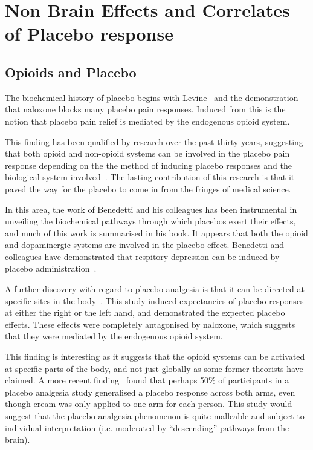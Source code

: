 \section{Non Brain Effects and Correlates of Placebo response}
\label{sec:non-brain-effects}

\subsection{Opioids and Placebo}
\label{sec:opiods-placebo}

The biochemical history of placebo begins with Levine~\cite{Levine1978a} and the demonstration that naloxone blocks many placebo pain responses. Induced from this is the notion that placebo pain relief is mediated by the endogenous opioid system. 

This finding has been qualified by research over the past thirty years, suggesting that both opioid and non-opioid systems can be involved in the placebo pain response depending on the the method of inducing placebo responses and the biological system involved~\cite{Amanzio2001,benedetti2003a}. The lasting contribution of this research is that it paved the way for the placebo to come in from the fringes of medical science.

In this area, the work of Benedetti and his colleagues has been instrumental in unveiling the biochemical pathways through which placebos exert their effects, and much of this work is summarised in his book.  It appears that both the opioid and dopaminergic systems are involved in the placebo effect.  Benedetti and colleagues have demonstrated that respitory depression can be induced by placebo administration~\cite{Benedetti1999a}. 

A further discovery with regard to placebo analgesia is that it can be directed at specific sites in the body~\cite{Benedetti1999}. This study induced expectancies of placebo responses at either the right or the left hand, and demonstrated the expected placebo effects. These effects were completely antagonised by naloxone, which suggests that they were mediated by the endogenous opioid system. 

This finding is interesting as it suggests that the opioid systems can be activated at specific parts of the body, and not just globally as some former theorists have claimed. A more recent finding~\cite{Watson2006} found that perhaps 50\% of participants in a placebo analgesia study generalised a placebo response across both arms, even though cream was only applied to one arm for each person. 
This study would suggest that the placebo analgesia phenomenon is quite malleable and subject to individual interpretation (i.e. moderated by ``descending'' pathways from the brain). 

